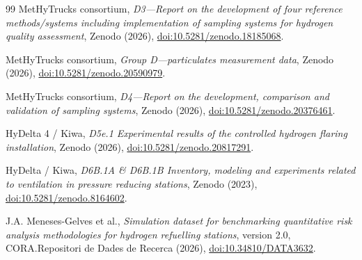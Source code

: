\documentclass[12pt,a4paper]{article}
\begin{document}
\begin{thebibliography}{99}
MetHyTrucks consortium, \textit{D3---Report on the development of four reference
methods/systems including implementation of sampling systems for hydrogen
quality assessment}, Zenodo (2026),
\href{https://doi.org/10.5281/zenodo.18185068}{doi:10.5281/zenodo.18185068}.

MetHyTrucks consortium, \textit{Group D---particulates measurement data},
Zenodo (2026),
\href{https://doi.org/10.5281/zenodo.20590979}{doi:10.5281/zenodo.20590979}.

MetHyTrucks consortium, \textit{D4---Report on the development, comparison and
validation of sampling systems}, Zenodo (2026),
\href{https://doi.org/10.5281/zenodo.20376461}{doi:10.5281/zenodo.20376461}.

HyDelta 4 / Kiwa, \textit{D5e.1 Experimental results of the controlled hydrogen
flaring installation}, Zenodo (2026),
\href{https://doi.org/10.5281/zenodo.20817291}{doi:10.5281/zenodo.20817291}.

HyDelta / Kiwa, \textit{D6B.1A \& D6B.1B Inventory, modeling and experiments
related to ventilation in pressure reducing stations}, Zenodo (2023),
\href{https://doi.org/10.5281/zenodo.8164602}{doi:10.5281/zenodo.8164602}.

J.A. Meneses-Gelves et al., \textit{Simulation dataset for benchmarking
quantitative risk analysis methodologies for hydrogen refuelling stations},
version 2.0, CORA.Repositori de Dades de Recerca (2026),
\href{https://doi.org/10.34810/DATA3632}{doi:10.34810/DATA3632}.
\end{thebibliography}
\end{document}
